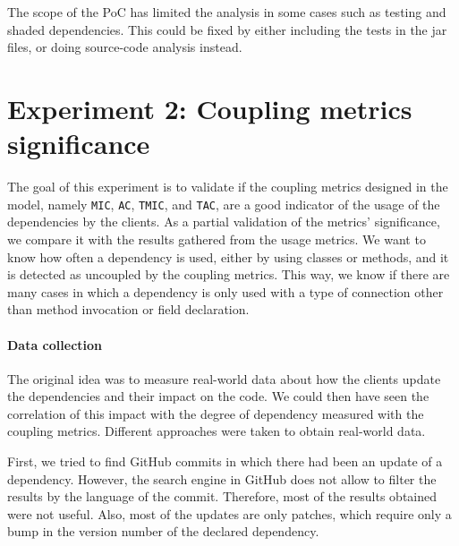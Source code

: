 \begin{finding}
	The scope of the PoC has limited the analysis in some cases such as testing and shaded dependencies. This could be fixed by either including the tests in the jar files, or doing source-code analysis instead.
	\label{find:source-code-analysis}
\end{finding}

\section{Experiment 2: Coupling metrics significance}\label{sec:experiment2}

The goal of this experiment is to validate if the coupling metrics designed in the model, namely \texttt{MIC}, \texttt{AC}, \texttt{TMIC}, and \texttt{TAC}, are a good indicator of the usage of the dependencies by the clients. As a partial validation of the metrics' significance, we compare it with the results gathered from the usage metrics. We want to know how often a dependency is used, either by using classes or methods, and it is detected as uncoupled by the coupling metrics. This way, we know if there are many cases in which a dependency is only used with a type of connection other than method invocation or field declaration.

\paragraph{Data collection}
The original idea was to measure real-world data about how the clients update the dependencies and their impact on the code. We could then have seen the correlation of this impact with the degree of dependency measured with the coupling metrics. Different approaches were taken to obtain real-world data.

First, we tried to find GitHub commits in which there had been an update of a dependency. However, the search engine in GitHub does not allow to filter the results by the language of the commit. Therefore, most of the results obtained were not useful. Also, most of the updates are only patches, which require only a bump in the version number of the declared dependency.

